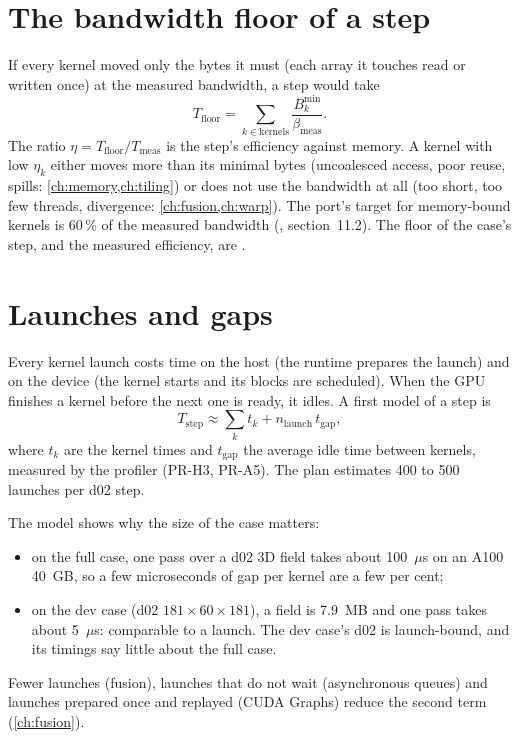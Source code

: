 \section{The bandwidth floor of a step}

If every kernel moved only the bytes it must (each array it touches read or written once) at the measured bandwidth,
a step would take
\begin{equation}
  T_{\text{floor}} = \sum_{k \in \text{kernels}} \frac{B_k^{\min}}{\beta_{\text{meas}}}.
\end{equation}
The ratio $\eta = T_{\text{floor}}/T_{\text{meas}}$ is the step's efficiency against memory. A kernel with low
$\eta_k$ either moves more than its minimal bytes (uncoalesced access, poor reuse, spills: \cref{ch:memory,ch:tiling})
or does not use the bandwidth at all (too short, too few threads, divergence: \cref{ch:fusion,ch:warp}). The port's
target for memory-bound kernels is 60\,\% of the measured bandwidth (, section~11.2). The floor of the
case's step, and the measured efficiency, are \tbr.

\section{Launches and gaps}

Every kernel launch costs time on the host (the runtime prepares the launch) and on the device (the kernel starts and
its blocks are scheduled). When the GPU finishes a kernel before the next one is ready, it idles. A first model of a
step is
\begin{equation}
  T_{\text{step}} \approx \sum_k t_k + n_{\text{launch}}\, t_{\text{gap}},
\end{equation}
where $t_k$ are the kernel times and $t_{\text{gap}}$ the average idle time between kernels, measured by the profiler
(PR-H3, PR-A5). The plan estimates 400 to 500 launches per d02 step.

The model shows why the size of the case matters:
\begin{itemize}
  \item on the full case, one pass over a d02 3D field takes about 100~$\mu$s on an A100 40~GB, so a few
    microseconds of gap per kernel are a few per cent;
  \item on the dev case (d02 $181 \times 60 \times 181$), a field is 7.9~MB and one pass takes about 5~$\mu$s:
    comparable to a launch. The dev case's d02 is launch-bound, and its timings say little about the full case.
\end{itemize}
Fewer launches (fusion), launches that do not wait (asynchronous queues) and launches prepared once and replayed
(CUDA Graphs) reduce the second term (\cref{ch:fusion}).

